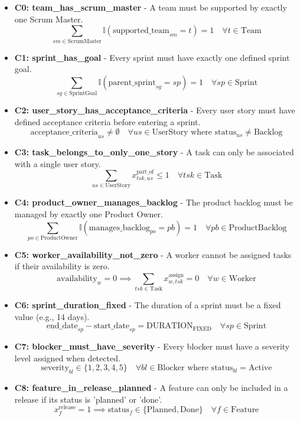 \documentclass[11pt]{article}
\begin{document}
\begin{itemize}
    \item \textbf{C0: team\_has\_scrum\_master} - A team must be supported by exactly one Scrum Master.
        \[ \sum_{sm \in \text{ScrumMaster}} \mathbb{I}(\text{supported\_team}_{sm} = t) = 1 \quad \forall t \in \text{Team} \]
    \item \textbf{C1: sprint\_has\_goal} - Every sprint must have exactly one defined sprint goal.
        \[ \sum_{sg \in \text{SprintGoal}} \mathbb{I}(\text{parent\_sprint}_{sg} = sp) = 1 \quad \forall sp \in \text{Sprint} \]
    \item \textbf{C2: user\_story\_has\_acceptance\_criteria} - Every user story must have defined acceptance criteria before entering a sprint.
        \[ \text{acceptance\_criteria}_{us} \neq \emptyset \quad \forall us \in \text{UserStory} \text{ where } \text{status}_{us} \neq \text{Backlog} \]
    \item \textbf{C3: task\_belongs\_to\_only\_one\_story} - A task can only be associated with a single user story.
        \[ \sum_{us \in \text{UserStory}} x^{\text{part\_of}}_{tsk, us} \leq 1 \quad \forall tsk \in \text{Task} \]
    \item \textbf{C4: product\_owner\_manages\_backlog} - The product backlog must be managed by exactly one Product Owner.
        \[ \sum_{po \in \text{ProductOwner}} \mathbb{I}(\text{manages\_backlog}_{po} = pb) = 1 \quad \forall pb \in \text{ProductBacklog} \]
    \item \textbf{C5: worker\_availability\_not\_zero} - A worker cannot be assigned tasks if their availability is zero.
        \[ \text{availability}_{w} = 0 \implies \sum_{tsk \in \text{Task}} x^{\text{assign}}_{w, tsk} = 0 \quad \forall w \in \text{Worker} \]
    \item \textbf{C6: sprint\_duration\_fixed} - The duration of a sprint must be a fixed value (e.g., 14 days).
        \[ \text{end\_date}_{sp} - \text{start\_date}_{sp} = \text{DURATION}_{\text{FIXED}} \quad \forall sp \in \text{Sprint} \]
    \item \textbf{C7: blocker\_must\_have\_severity} - Every blocker must have a severity level assigned when detected.
        \[ \text{severity}_{bl} \in \{1, 2, 3, 4, 5\} \quad \forall bl \in \text{Blocker} \text{ where } \text{status}_{bl} = \text{Active} \]
    \item \textbf{C8: feature\_in\_release\_planned} - A feature can only be included in a release if its status is 'planned' or 'done'.
        \[ x^{\text{release}}_{f} = 1 \implies \text{status}_{f} \in \{\text{Planned}, \text{Done}\} \quad \forall f \in \text{Feature} \]

\end{itemize}
\end{document}
